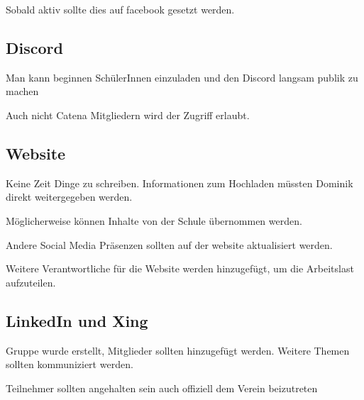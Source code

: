 \documentclass[a4paper, 11pt]{article}
\begin{document}
Sobald aktiv sollte dies auf facebook gesetzt werden.

\subsection*{Discord}

Man kann beginnen SchülerInnen einzuladen und den Discord langsam publik zu machen

Auch nicht Catena Mitgliedern wird der Zugriff erlaubt.

\subsection*{Website}

Keine Zeit Dinge zu schreiben. Informationen zum Hochladen müssten Dominik direkt weitergegeben werden.

Möglicherweise können Inhalte von der Schule übernommen werden.

Andere Social Media Präsenzen sollten auf der website aktualisiert werden.

Weitere Verantwortliche für die Website werden hinzugefügt, um die Arbeitslast aufzuteilen.

\subsection{LinkedIn und Xing}

Gruppe wurde erstellt, Mitglieder sollten hinzugefügt werden.
Weitere Themen sollten kommuniziert werden.

Teilnehmer sollten angehalten sein auch offiziell dem Verein beizutreten
\end{document}
